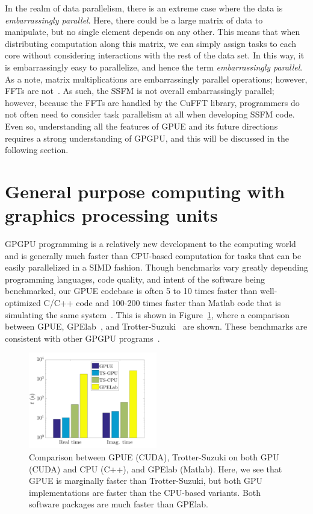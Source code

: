 In the realm of data parallelism, there is an extreme case where the data is \textit{embarrassingly parallel}.
Here, there could be a large matrix of data to manipulate, but no single element depends on any other.
This means that when distributing computation along this matrix, we can simply assign tasks to each core without considering interactions with the rest of the data set.
In this way, it is embarrassingly easy to parallelize, and hence the term \textit{embarrassingly parallel}.
As a note, matrix multiplications are embarrassingly parallel operations; however, FFTs are not~\cite{czechowski2012}.
As such, the SSFM is not overall embarrassingly parallel; however, because the FFTs are handled by the CuFFT library, programmers do not often need to consider task parallelism at all when developing SSFM code.
Even so, understanding all the features of GPUE and its future directions requires a strong understanding of GPGPU, and this will be discussed in the following section.

\section{General purpose computing with graphics processing units}

GPGPU programming is a relatively new development to the computing world and is generally much faster than CPU-based computation for tasks that can be easily parallelized in a SIMD fashion.
Though benchmarks vary greatly depending programming languages, code quality, and intent of the software being benchmarked, our GPUE codebase is often 5 to 10 times faster than well-optimized C/C++ code and 100-200 times faster than Matlab code that is simulating the same system~\cite{wittek2016}.
This is shown in Figure~\ref{fig:bench}, where a comparison between GPUE, GPElab~\cite{antoine2014}, and Trotter-Suzuki~\cite{wittek2013} are shown.
These benchmarks are consistent with other GPGPU programs~\cite{garland2008, lee2010, nickolls2010}.

\begin{figure}
\center \includegraphics[width=0.5\textwidth]{data/gpu/GPUEvsTS.png}
\caption{Comparison between GPUE (CUDA), Trotter-Suzuki on both GPU (CUDA) and CPU (C++), and GPElab (Matlab).
Here, we see that GPUE is marginally faster than Trotter-Suzuki, but both GPU implementations are faster than the CPU-based variants.
Both software packages are much faster than GPElab.}
\label{fig:bench}
\end{figure}

